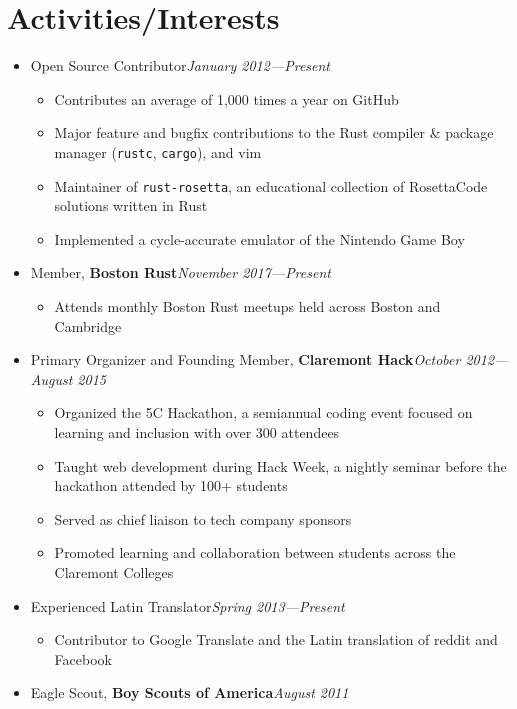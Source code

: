 \documentclass[10pt]{article}
\newcommand\activity[3]{{#1, \textbf{#3}\hfill\textit{#2}}}
\begin{document}
\section*{Activities/Interests}
\begin{itemize}[label=,leftmargin=0pt]
    \item Open Source Contributor\hfill\textit{January 2012---Present}
        \begin{itemize}[topsep=2pt]
            \item Contributes an average of 1,000 times a year on GitHub
            \item Major feature and bugfix contributions to the Rust compiler
            \& package manager (\texttt{rustc}, \texttt{cargo}), and vim
            \item Maintainer of \texttt{rust-rosetta}, an educational collection
            of RosettaCode solutions written in Rust
            \item Implemented a cycle-accurate emulator of the Nintendo Game
            Boy
        \end{itemize}
    \item \activity{Member}{November 2017---Present}{Boston Rust}
        \begin{itemize}[topsep=2pt]
            \item Attends monthly Boston Rust meetups held across Boston and
            Cambridge
        \end{itemize}
    \item \activity{Primary Organizer and Founding Member}{October 2012---August 2015}{Claremont Hack}
        \begin{itemize}[topsep=2pt]
        \item Organized the 5C Hackathon, a semiannual coding event focused on
        learning and inclusion with over 300 attendees
            \item Taught web development during Hack Week, a nightly seminar
            before the hackathon attended by 100+ students
            \item Served as chief liaison to tech company sponsors
            \item Promoted learning and collaboration between students across
            the Claremont Colleges
        \end{itemize}
    \item Experienced Latin Translator\hfill\textit{Spring 2013---Present}
        \begin{itemize}[topsep=2pt]
            \item Contributor to Google Translate and the Latin translation of
                reddit and Facebook
        \end{itemize}
    \item \activity{Eagle Scout}{August 2011}{Boy Scouts of America}
\end{itemize}
\end{document}
